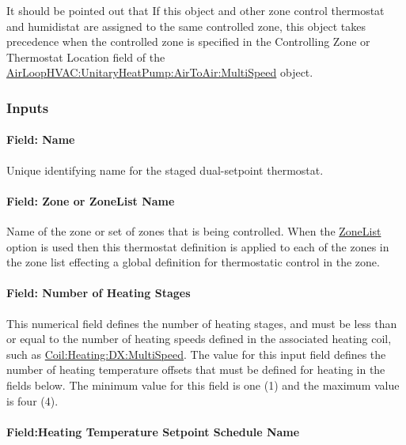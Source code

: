 It should be pointed out that If this object and other zone control thermostat and humidistat are assigned to the same controlled zone, this object takes precedence when the controlled zone is specified in the Controlling Zone or Thermostat Location field of the \hyperref[airloophvacunitaryheatpumpairtoairmultispeed]{AirLoopHVAC:UnitaryHeatPump:AirToAir:MultiSpeed} object.

\subsubsection{Inputs}\label{inputs-7-030}

\paragraph{Field: Name}\label{field-name-5-028}

Unique identifying name for the staged dual-setpoint thermostat.

\paragraph{Field: Zone or ZoneList Name}\label{field-zone-or-zonelist-name-1-001}

Name of the zone or set of zones that is being controlled. When the \hyperref[zonelist]{ZoneList} option is used then this thermostat definition is applied to each of the zones in the zone list effecting a global definition for thermostatic control in the zone.

\paragraph{Field: Number of Heating Stages}\label{field-number-of-heating-stages}

This numerical field defines the number of heating stages, and must be less than or equal to the number of heating speeds defined in the associated heating coil, such as \hyperref[coilheatingdxmultispeed]{Coil:Heating:DX:MultiSpeed}. The value for this input field defines the number of heating temperature offsets that must be defined for heating in the fields below. The minimum value for this field is one (1) and the maximum value is four (4).

\paragraph{Field:Heating Temperature Setpoint Schedule Name}\label{fieldheating-temperature-setpoint-schedule-name}

